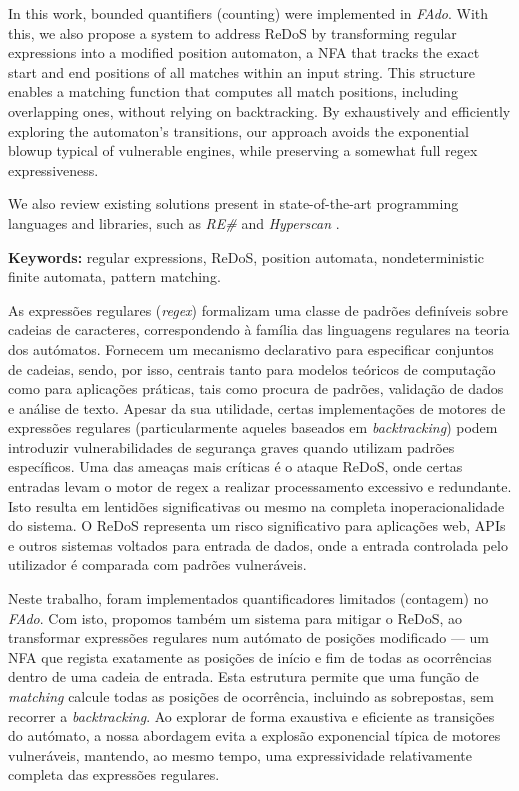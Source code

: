 \noindent In this work, bounded quantifiers (counting) were implemented in \textit{FAdo}. With this, we also propose a system to address \ac{ReDoS} by transforming regular expressions into a modified position automaton, a \ac{NFA} that tracks the exact start and end positions of all matches within an input string. This structure enables a matching function that computes all match positions, including overlapping ones, without relying on backtracking. By exhaustively and efficiently exploring the automaton's transitions, our approach avoids the exponential blowup typical of vulnerable engines, while preserving a somewhat full regex expressiveness.

\noindent We also review existing solutions present in state-of-the-art programming languages and libraries, such as \emph{RE\#} \cite{resharp_tool_paper} and \emph{Hyperscan} \cite{hyperscan_paper}.

\textbf{Keywords:} regular expressions, ReDoS, position automata, nondeterministic finite automata, pattern matching.

\noindent As expressões regulares (\emph{regex}) formalizam uma classe de padrões definíveis sobre cadeias de caracteres, correspondendo à família das linguagens regulares na teoria dos autómatos. Fornecem um mecanismo declarativo para especificar conjuntos de cadeias, sendo, por isso, centrais tanto para modelos teóricos de computação como para aplicações práticas, tais como procura de padrões, validação de dados e análise de texto. Apesar da sua utilidade, certas implementações de motores de expressões regulares (particularmente aqueles baseados em \textit{backtracking}) podem introduzir vulnerabilidades de segurança graves quando utilizam padrões específicos. Uma das ameaças mais críticas é o ataque \ac{ReDoS}, onde certas entradas levam o motor de regex a realizar processamento excessivo e redundante. Isto resulta em lentidões significativas ou mesmo na completa inoperacionalidade do sistema. O \ac{ReDoS} representa um risco significativo para aplicações web, APIs e outros sistemas voltados para entrada de dados, onde a entrada controlada pelo utilizador é comparada com padrões vulneráveis.

\noindent Neste trabalho, foram implementados quantificadores limitados (contagem) no \textit{FAdo}. Com isto, propomos também um sistema para mitigar o \ac{ReDoS}, ao transformar expressões regulares num autómato de posições modificado --- um \ac{NFA} que regista exatamente as posições de início e fim de todas as ocorrências dentro de uma cadeia de entrada. Esta estrutura permite que uma função de \textit{matching} calcule todas as posições de ocorrência, incluindo as sobrepostas, sem recorrer a \textit{backtracking}. Ao explorar de forma exaustiva e eficiente as transições do autómato, a nossa abordagem evita a explosão exponencial típica de motores vulneráveis, mantendo, ao mesmo tempo, uma expressividade relativamente completa das expressões regulares.

